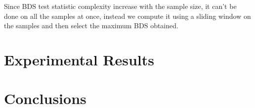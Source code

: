 Since BDS test statistic complexity increase with the sample size, it can't be done on all the samples at once, instead we compute it using a sliding window on the samples and then select the maximum BDS obtained.



\section{Experimental Results}

\section{Conclusions}

